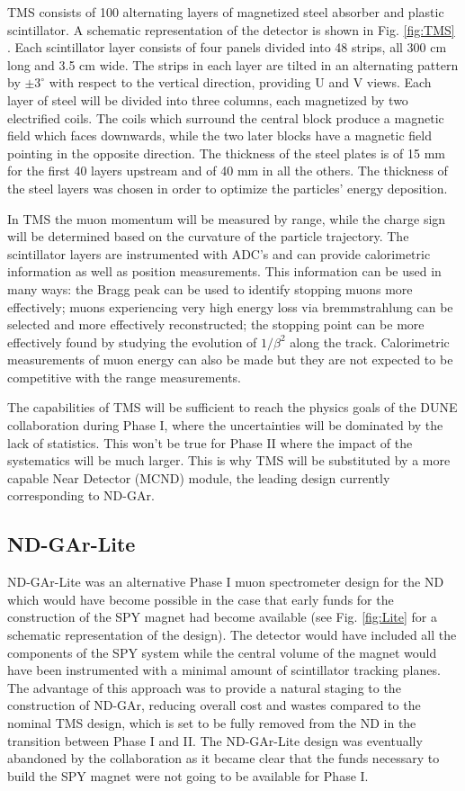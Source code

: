 TMS consists of 100 alternating layers of magnetized steel absorber and plastic scintillator. A schematic representation of the detector is shown in Fig. \ref{fig:TMS} . Each scintillator layer consists of four panels divided into 48 strips, all 300 cm long and 3.5 cm wide. The strips in each layer are tilted in an alternating pattern by $\pm 3^\circ$ with respect to the vertical direction, providing U and V views. Each layer of steel will be divided into three columns, each magnetized by two electrified coils. The coils which surround the central block produce a magnetic field which faces downwards, while the two later blocks have a magnetic field pointing  in the opposite direction. The thickness of the steel plates is of 15 mm for the first 40 layers upstream and of 40 mm in all the others. The thickness of the steel layers was chosen in order to optimize the particles' energy deposition.

In TMS the muon momentum will be measured by range, while the charge sign will be determined based on the curvature of the particle trajectory. The scintillator layers are instrumented with ADC's and can provide calorimetric information as well as position measurements. This information can be used in many ways: the Bragg peak can be used to identify stopping muons more effectively; muons experiencing very high energy loss via bremmstrahlung can be selected and more effectively reconstructed; the stopping point can be more effectively found by studying the evolution of $1/\beta^2$ along the track. Calorimetric measurements of muon energy can also be made but they are not expected to be competitive with the range measurements. 

The capabilities of TMS will be sufficient to reach the physics goals of the DUNE collaboration during Phase I, where the uncertainties will be dominated by the lack of statistics. This won't be true for Phase II where the impact of the systematics will be much larger. This is why TMS will be substituted by a more capable Near Detector (MCND) module, the leading design currently corresponding to ND-GAr. 

\subsection{ND-GAr-Lite}
\label{Sec: DUNE-GArLite}

ND-GAr-Lite was an alternative Phase I muon spectrometer design for the ND which would have become possible in the case that early funds for the construction of the SPY magnet had become available \cite{ND-GAR-LiteCDR} (see Fig. \ref{fig:Lite} for a schematic representation of the design). The detector would have included all the components of the SPY system while the central volume of the magnet would have been instrumented with a minimal amount of scintillator tracking planes. The advantage of this approach was to provide a natural staging to the construction of ND-GAr, reducing overall cost and wastes compared to the nominal TMS design, which is set to be fully removed from the ND in the transition between Phase I and II. The ND-GAr-Lite design was eventually abandoned by the collaboration as it became clear that the funds necessary to build the SPY magnet were not going to be available for Phase I. 

